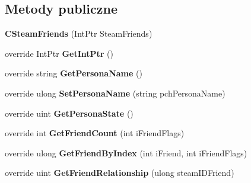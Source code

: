 \subsection*{Metody publiczne}
\begin{DoxyCompactItemize}
\item 
\mbox{\label{class_valve_1_1_steamworks_1_1_c_steam_friends_a43d4379f192ecbb53739991f7ba83c3e}} 
{\bfseries C\+Steam\+Friends} (Int\+Ptr Steam\+Friends)
\item 
\mbox{\label{class_valve_1_1_steamworks_1_1_c_steam_friends_ae459ea32bc599d24a9db243f41c62413}} 
override Int\+Ptr {\bfseries Get\+Int\+Ptr} ()
\item 
\mbox{\label{class_valve_1_1_steamworks_1_1_c_steam_friends_a67d875556a1bea1b40ea012d39910b0b}} 
override string {\bfseries Get\+Persona\+Name} ()
\item 
\mbox{\label{class_valve_1_1_steamworks_1_1_c_steam_friends_a0f0af9c2f3f99b24e15cc14bb35ac67d}} 
override ulong {\bfseries Set\+Persona\+Name} (string pch\+Persona\+Name)
\item 
\mbox{\label{class_valve_1_1_steamworks_1_1_c_steam_friends_a1607848129fd6dfea96a83c989e4aa67}} 
override uint {\bfseries Get\+Persona\+State} ()
\item 
\mbox{\label{class_valve_1_1_steamworks_1_1_c_steam_friends_a31b1b46c61d74b3df5c2813aece57262}} 
override int {\bfseries Get\+Friend\+Count} (int i\+Friend\+Flags)
\item 
\mbox{\label{class_valve_1_1_steamworks_1_1_c_steam_friends_a9b03c99c71d8cea3ec9ec4a1b6c2ec84}} 
override ulong {\bfseries Get\+Friend\+By\+Index} (int i\+Friend, int i\+Friend\+Flags)
\item 
\mbox{\label{class_valve_1_1_steamworks_1_1_c_steam_friends_a37818e73002da18a173b4eb88adab3c0}} 
override uint {\bfseries Get\+Friend\+Relationship} (ulong steam\+I\+D\+Friend)

\end{DoxyCompactItemize}
